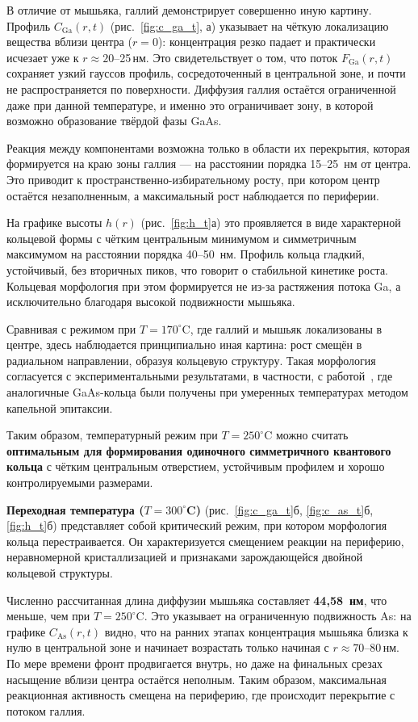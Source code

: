 \documentclass[14pt,oneside]{extarticle}
\begin{document}
В отличие от мышьяка, галлий демонстрирует совершенно иную картину. Профиль $C_{\text{Ga}}(r, t)$ (рис.~\ref{fig:c_ga_t}, а) указывает на чёткую локализацию вещества вблизи центра ($r = 0$): концентрация резко падает и практически исчезает уже к $r \approx 20$–25\,нм. Это свидетельствует о том, что поток $F_{\text{Ga}}(r, t)$ сохраняет узкий гауссов профиль, сосредоточенный в центральной зоне, и почти не распространяется по поверхности. Диффузия галлия остаётся ограниченной даже при данной температуре, и именно это ограничивает зону, в которой возможно образование твёрдой фазы GaAs.

Реакция между компонентами возможна только в области их перекрытия, которая формируется на краю зоны галлия — на расстоянии порядка 15–25~нм от центра. Это приводит к пространственно-избирательному росту, при котором центр остаётся незаполненным, а максимальный рост наблюдается по периферии.

На графике высоты $h(r)$ (рис.~\ref{fig:h_t}а) это проявляется в виде характерной кольцевой формы с чётким центральным минимумом и симметричным максимумом на расстоянии порядка 40–50~нм. Профиль кольца гладкий, устойчивый, без вторичных пиков, что говорит о стабильной кинетике роста. Кольцевая морфология при этом формируется не из-за растяжения потока Ga, а исключительно благодаря высокой подвижности мышьяка.

Сравнивая с режимом при $T = 170^\circ$C, где галлий и мышьяк локализованы в центре, здесь наблюдается принципиально иная картина: рост смещён в радиальном направлении, образуя кольцевую структуру. Такая морфология согласуется с экспериментальными результатами, в частности, с работой~\cite{mano2005self}, где аналогичные GaAs-кольца были получены при умеренных температурах методом капельной эпитаксии.

Таким образом, температурный режим при $T = 250^\circ$C можно считать \textbf{оптимальным для формирования одиночного симметричного квантового кольца} с чётким центральным отверстием, устойчивым профилем и хорошо контролируемыми размерами.

\textbf{Переходная температура ($T = 300^\circ$C)} (рис.~\ref{fig:c_ga_t}б, \ref{fig:c_as_t}б, \ref{fig:h_t}б) представляет собой критический режим, при котором морфология кольца перестраивается. Он характеризуется смещением реакции на периферию, неравномерной кристаллизацией и признаками зарождающейся двойной кольцевой структуры.

Численно рассчитанная длина диффузии мышьяка составляет \textbf{44{,}58~нм}, что меньше, чем при $T = 250^\circ$C. Это указывает на ограниченную подвижность As: на графике $C_{\text{As}}(r, t)$ видно, что на ранних этапах концентрация мышьяка близка к нулю в центральной зоне и начинает возрастать только начиная с $r \approx 70$–80\,нм. По мере времени фронт продвигается внутрь, но даже на финальных срезах насыщение вблизи центра остаётся неполным. Таким образом, максимальная реакционная активность смещена на периферию, где происходит перекрытие с потоком галлия.
\end{document}
